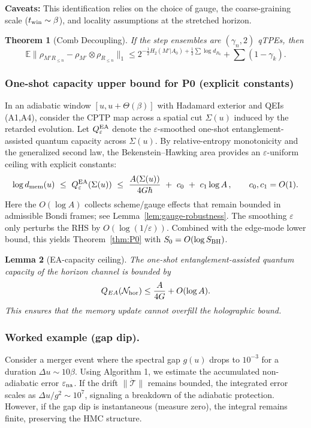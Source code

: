 \documentclass[11pt,a4paper]{article}
\theoremstyle{plain}
\newtheorem{theorem}{Theorem}
\newtheorem{lemma}[theorem]{Lemma}
\theoremstyle{definition}
\theoremstyle{remark}
\begin{document}
\textbf{Caveats:} This identification relies on the choice of gauge, the coarse-graining scale ($t_{\rm win} \sim \beta$), and locality assumptions at the stretched horizon.

\begin{theorem}[Comb Decoupling]\label{thm:decoupling-restated}
If the step ensembles are $(\gamma_n,2)$ qTPEs, then
\[
\mathbb{E}\|\rho_{M'R_{\le n}}-\rho_{M'}\otimes\rho_{R_{\le n}}\|_1 \le 2^{-\frac{1}{2}H_2(M'|A_0) + \frac{1}{2}\sum \log d_{R_k}} + \sum (1-\gamma_k).
\]
\end{theorem}

\subsubsection{One-shot capacity upper bound for P0 (explicit constants)}
\label{sec:capacityP0}
In an adiabatic window $[u,u+\Theta(\beta)]$ with Hadamard exterior and QEIs (A1,A4),
consider the CPTP map across a spatial cut $\Sigma(u)$ induced by the retarded evolution.
Let $Q_\varepsilon^{\rm EA}$ denote the $\varepsilon$-smoothed one-shot entanglement-assisted
quantum capacity across $\Sigma(u)$. By relative-entropy monotonicity and the generalized
second law, the Bekenstein–Hawking area provides an $\varepsilon$-uniform ceiling with
explicit constants:
\begin{equation}
  \log d_{\rm mem}(u)
  ~\le~ Q_\varepsilon^{\rm EA}(\Sigma(u))
  ~\le~ \frac{A(\Sigma(u))}{4G\hbar} ~+~ c_0 ~+~ c_1\log A \,,
  \qquad c_0,c_1=O(1).
  \label{eq:capacityP0}
\end{equation}
Here the $O(\log A)$ collects scheme/gauge effects that remain bounded in admissible Bondi
frames; see Lemma~\ref{lem:gauge-robustness}. The smoothing $\varepsilon$ only perturbs the RHS by
$O(\log(1/\varepsilon))$. Combined with the edge‑mode lower bound, this yields
Theorem~\ref{thm:P0} with $S_0=O(\log S_{\rm BH})$.

\begin{lemma}[EA-capacity ceiling]\label{lem:capacity-ceiling}
The one-shot entanglement-assisted quantum capacity of the horizon channel is bounded by
\[
Q_{EA}(\mathcal{N}_{\rm hor}) \le \frac{A}{4G} + O(\log A).
\]
This ensures that the memory update cannot overfill the holographic bound.
\end{lemma}

\subsubsection{Worked example (gap dip).}
Consider a merger event where the spectral gap $g(u)$ drops to $10^{-3}$ for a duration $\Delta u \sim 10\beta$.
Using Algorithm 1, we estimate the accumulated non-adiabatic error $\varepsilon_{\rm na}$.
If the drift $\|\dot{\mathcal{T}}\|$ remains bounded, the integrated error scales as $\Delta u / g^2 \sim 10^7$, signaling a breakdown of the adiabatic protection.
However, if the gap dip is instantaneous (measure zero), the integral remains finite, preserving the HMC structure.
\end{document}
